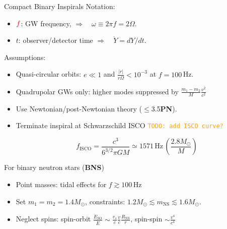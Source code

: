 \documentclass[xcolor=dvipsnames,handout,t]{beamer}
\newcommand{\todo}[1]{\textcolor{orange}{\texttt{TODO: #1}}}
\newcommand{\red}[1]{\textcolor{red}{#1}}
\newcommand{\f}{\frac}
\begin{document}
 \begin{frame}{Compact Binary Inspirals}
 Notation:
 \begin{itemize}
  \item $\red{f} $: GW frequency, \hspace{1.5cm} $\Longrightarrow\quad \omega\equiv2\pi f = 2\Omega$.
  \item $t$: observer/detector time \quad$ \Longrightarrow\quad\dot{Y}= dY/dt$.
 \end{itemize}

  Assumptions:
  \begin{itemize}
   \item Quasi-circular orbits: $e \ll 1$ and $\tfrac{|\dot{r}|}{r\Omega} <10^{-3} $ at $f=100\,$Hz.
   \item Quadrupolar GWs only: higher modes suppressed by $\tfrac{m_1-m_2}{M}\tfrac{v^2}{c^2}$
   \item Use Newtonian/post-Newtonian theory ($\le$3.5{\bf PN}).
   \item Terminate inspiral at Schwarzschild ISCO \todo{add ISCO curve?}
   \begin{footnotesize}
   \[f_\text{ISCO} = \f{c^3}{6^{3/2}\pi G M} \simeq 1571\,\text{Hz}\, \left(\f{2.8M_\odot}{M}\right)\] 
   \end{footnotesize}
   \end{itemize}
   For binary neutron stars ({\bf BNS})
   \begin{itemize}
   \item Point masses: tidal effects for $f \gtrsim 100\,$Hz
   \item Set $m_1 =m_2 = 1.4 M_\odot$, constraints: $1.2 M_\odot \lesssim m_\text{NS}\lesssim 1.6M_\odot$.
   \item Neglect spins: spin-orbit $\tfrac{\dot{E}_\text{SO}}{\dot{E}} \sim \tfrac{v_s}{c}\tfrac{v}{c}\tfrac{R_\text{NS}}{r}$, spin-spin $\sim \tfrac{v^4}{c^4}$
   \end{itemize}
  

 \end{frame}
\end{document}
